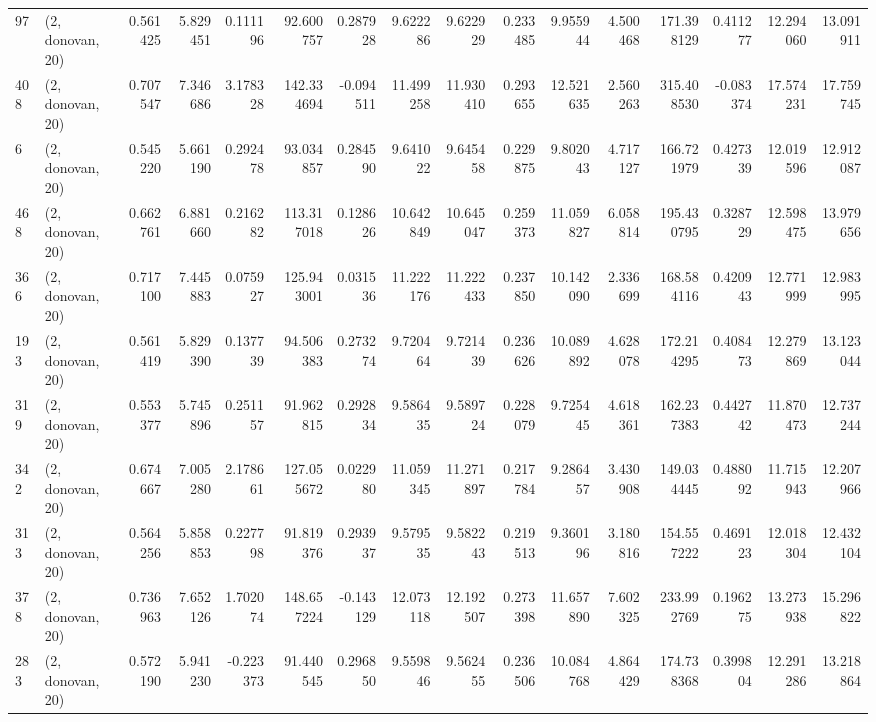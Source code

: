 \begin{tabular}{llrrrrrrrrrrrrrr}
97  &  (2, donovan, 20) &   0.561425 &   5.829451 &   0.111196 &    92.600757 &   0.287928 &   9.622286 &   9.622929 &  0.233485 &   9.955944 &   4.500468 &   171.398129 &  0.411277 &  12.294060 &  13.091911 \\
408 &  (2, donovan, 20) &   0.707547 &   7.346686 &   3.178328 &   142.334694 &  -0.094511 &  11.499258 &  11.930410 &  0.293655 &  12.521635 &   2.560263 &   315.408530 & -0.083374 &  17.574231 &  17.759745 \\
6   &  (2, donovan, 20) &   0.545220 &   5.661190 &   0.292478 &    93.034857 &   0.284590 &   9.641022 &   9.645458 &  0.229875 &   9.802043 &   4.717127 &   166.721979 &  0.427339 &  12.019596 &  12.912087 \\
468 &  (2, donovan, 20) &   0.662761 &   6.881660 &   0.216282 &   113.317018 &   0.128626 &  10.642849 &  10.645047 &  0.259373 &  11.059827 &   6.058814 &   195.430795 &  0.328729 &  12.598475 &  13.979656 \\
366 &  (2, donovan, 20) &   0.717100 &   7.445883 &   0.075927 &   125.943001 &   0.031536 &  11.222176 &  11.222433 &  0.237850 &  10.142090 &   2.336699 &   168.584116 &  0.420943 &  12.771999 &  12.983995 \\
193 &  (2, donovan, 20) &   0.561419 &   5.829390 &   0.137739 &    94.506383 &   0.273274 &   9.720464 &   9.721439 &  0.236626 &  10.089892 &   4.628078 &   172.214295 &  0.408473 &  12.279869 &  13.123044 \\
319 &  (2, donovan, 20) &   0.553377 &   5.745896 &   0.251157 &    91.962815 &   0.292834 &   9.586435 &   9.589724 &  0.228079 &   9.725445 &   4.618361 &   162.237383 &  0.442742 &  11.870473 &  12.737244 \\
342 &  (2, donovan, 20) &   0.674667 &   7.005280 &   2.178661 &   127.055672 &   0.022980 &  11.059345 &  11.271897 &  0.217784 &   9.286457 &   3.430908 &   149.034445 &  0.488092 &  11.715943 &  12.207966 \\
313 &  (2, donovan, 20) &   0.564256 &   5.858853 &   0.227798 &    91.819376 &   0.293937 &   9.579535 &   9.582243 &  0.219513 &   9.360196 &   3.180816 &   154.557222 &  0.469123 &  12.018304 &  12.432104 \\
378 &  (2, donovan, 20) &   0.736963 &   7.652126 &   1.702074 &   148.657224 &  -0.143129 &  12.073118 &  12.192507 &  0.273398 &  11.657890 &   7.602325 &   233.992769 &  0.196275 &  13.273938 &  15.296822 \\
283 &  (2, donovan, 20) &   0.572190 &   5.941230 &  -0.223373 &    91.440545 &   0.296850 &   9.559846 &   9.562455 &  0.236506 &  10.084768 &   4.864429 &   174.738368 &  0.399804 &  12.291286 &  13.218864 \\

\end{tabular}
